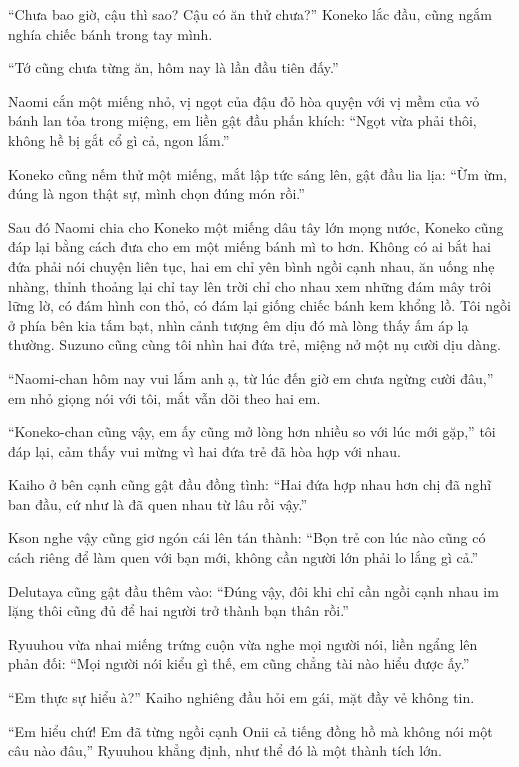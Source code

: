 ﻿\documentclass[../main.tex]{subfiles}
\begin{document}
``Chưa bao giờ, cậu thì sao? Cậu có ăn thử chưa?'' Koneko lắc đầu, cũng ngắm nghía chiếc bánh trong tay mình.

``Tớ cũng chưa từng ăn, hôm nay là lần đầu tiên đấy.''

Naomi cắn một miếng nhỏ, vị ngọt của đậu đỏ hòa quyện với vị mềm của vỏ bánh lan tỏa trong miệng, em liền gật đầu phấn khích: ``Ngọt vừa phải thôi, không hề bị gắt cổ gì cả, ngon lắm.''

Koneko cũng nếm thử một miếng, mắt lập tức sáng lên, gật đầu lia lịa: ``Ừm ừm, đúng là ngon thật sự, mình chọn đúng món rồi.''

Sau đó Naomi chia cho Koneko một miếng dâu tây lớn mọng nước, Koneko cũng đáp lại bằng cách đưa cho em một miếng bánh mì to hơn. Không có ai bắt hai đứa phải nói chuyện liên tục, hai em chỉ yên bình ngồi cạnh nhau, ăn uống nhẹ nhàng, thỉnh thoảng lại chỉ tay lên trời chỉ cho nhau xem những đám mây trôi lững lờ, có đám hình con thỏ, có đám lại giống chiếc bánh kem khổng lồ. Tôi ngồi ở phía bên kia tấm bạt, nhìn cảnh tượng êm dịu đó mà lòng thấy ấm áp lạ thường. Suzuno cũng cùng tôi nhìn hai đứa trẻ, miệng nở một nụ cười dịu dàng.

``Naomi-chan hôm nay vui lắm anh ạ, từ lúc đến giờ em chưa ngừng cười đâu,'' em nhỏ giọng nói với tôi, mắt vẫn dõi theo hai em.

``Koneko-chan cũng vậy, em ấy cũng mở lòng hơn nhiều so với lúc mới gặp,'' tôi đáp lại, cảm thấy vui mừng vì hai đứa trẻ đã hòa hợp với nhau.

Kaiho ở bên cạnh cũng gật đầu đồng tình: ``Hai đứa hợp nhau hơn chị đã nghĩ ban đầu, cứ như là đã quen nhau từ lâu rồi vậy.''

Kson nghe vậy cũng giơ ngón cái lên tán thành: ``Bọn trẻ con lúc nào cũng có cách riêng để làm quen với bạn mới, không cần người lớn phải lo lắng gì cả.''

Delutaya cũng gật đầu thêm vào: ``Đúng vậy, đôi khi chỉ cần ngồi cạnh nhau im lặng thôi cũng đủ để hai người trở thành bạn thân rồi.''

Ryuuhou vừa nhai miếng trứng cuộn vừa nghe mọi người nói, liền ngẩng lên phản đối: ``Mọi người nói kiểu gì thế, em cũng chẳng tài nào hiểu được ấy.''

``Em thực sự hiểu à?'' Kaiho nghiêng đầu hỏi em gái, mặt đầy vẻ không tin.

``Em hiểu chứ! Em đã từng ngồi cạnh Onii cả tiếng đồng hồ mà không nói một câu nào đâu,'' Ryuuhou khẳng định, như thể đó là một thành tích lớn.
\end{document}
